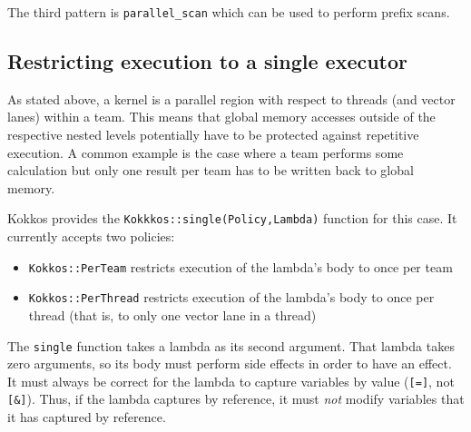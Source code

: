 The third pattern is \lstinline|parallel_scan| which can be used to perform prefix scans.

\subsection{Restricting execution to a single executor}

As stated above, a kernel is a parallel region with respect to threads (and vector lanes) within a team.
This means that global memory accesses outside of the respective nested levels potentially have to be protected against repetitive execution. 
A common example is the case where a team performs some calculation but only one result per team has to be written back to global memory. 

Kokkos provides the \lstinline|Kokkkos::single(Policy,Lambda)| function for this case.
It currently accepts two policies:
\begin{itemize}
\item \lstinline|Kokkos::PerTeam| restricts execution of the lambda's
  body to once per team
\item \lstinline|Kokkos::PerThread| restricts execution of the
  lambda's body to once per thread (that is, to only one vector lane
  in a thread)
\end{itemize}
The \lstinline!single! function takes a lambda as its second argument.
That lambda takes zero arguments, 
so its body must perform side effects in order to have an effect.
It must always be correct for the lambda to capture variables by value
(\lstinline![=]!, not \lstinline![&]!).
Thus, if the lambda captures by reference,
it must \emph{not} modify variables that it has captured by reference.

